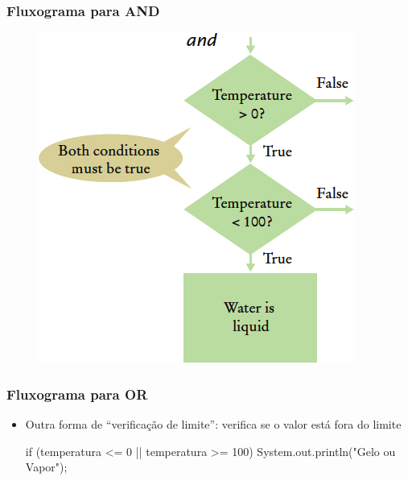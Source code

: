 \documentclass[xcolor={dvipsnames,table},aspectratio=169]{beamer}
\begin{document}
\begin{frame}[fragile]\frametitle{Fluxograma para AND}
\begin{figure}[h]
	\includegraphics[height=0.70\paperheight,center]{pucrs-ep-fprog-unidade_03-decisoes-laminas-fluxograma_and.png}
\end{figure}
\end{frame}

\begin{frame}[fragile]\frametitle{Fluxograma para OR}
\begin{itemize}
	\item Outra forma de ``verificação de limite'': verifica se o valor está fora do limite
\begin{javacode}
if (temperatura <= 0 || temperatura >= 100) {
  System.out.println("Gelo ou Vapor"); 
}
\end{javacode}
\end{itemize}
\end{frame}
\end{document}
